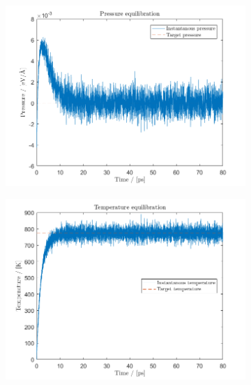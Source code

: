 \begin{figure}[H]
    \centering
    \captionsetup[subfigure]{justification=centering}
    \begin{subfigure}[b]{0.40\textwidth}
        \centering
        \includegraphics[width=\textwidth]{graphics/task3/pressure.png}
    \end{subfigure}
    \begin{subfigure}[b]{0.40\textwidth}
        \centering
        \includegraphics[width=\textwidth]{graphics/task3/temperature.png}

\end{subfigure}
\end{figure}
